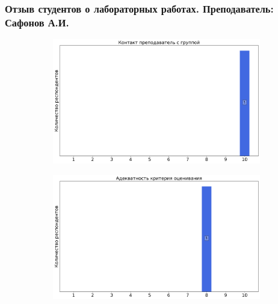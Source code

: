         \subsubsection{Отзыв студентов о лабораторных работах. Преподаватель: Сафонов А.И.}
            \begin{figure}[H]
                \centering
                \begin{subfigure}[b]{0.45\textwidth}
                    \centering
                    \includegraphics[width=\textwidth]{images/3 course/Общая физика - квантовая физика/labniks-marks-Сафонов А.И.-0.png}
                \end{subfigure}
                \begin{subfigure}[b]{0.45\textwidth}
                    \centering
                    \includegraphics[width=\textwidth]{images/3 course/Общая физика - квантовая физика/labniks-marks-Сафонов А.И.-1.png}
                \end{subfigure}
                \begin{subfigure}[b]{0.45\textwidth}

\end{subfigure}
\end{figure}
